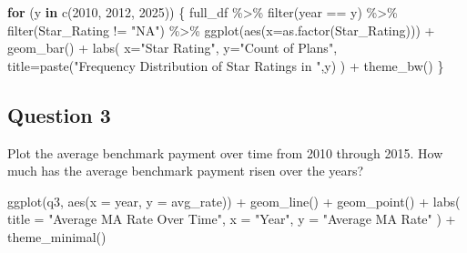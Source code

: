 \documentclass[
]{article}
\newenvironment{Shaded}{\begin{snugshade}}{\end{snugshade}}
\newcommand{\AttributeTok}[1]{\textcolor[rgb]{0.40,0.45,0.13}{#1}}
\newcommand{\ControlFlowTok}[1]{\textcolor[rgb]{0.00,0.23,0.31}{\textbf{#1}}}
\newcommand{\DecValTok}[1]{\textcolor[rgb]{0.68,0.00,0.00}{#1}}
\newcommand{\FunctionTok}[1]{\textcolor[rgb]{0.28,0.35,0.67}{#1}}
\newcommand{\NormalTok}[1]{\textcolor[rgb]{0.00,0.23,0.31}{#1}}
\newcommand{\SpecialCharTok}[1]{\textcolor[rgb]{0.37,0.37,0.37}{#1}}
\newcommand{\StringTok}[1]{\textcolor[rgb]{0.13,0.47,0.30}{#1}}
\begin{document}
\begin{Shaded}
\begin{Highlighting}[]
\ControlFlowTok{for}\NormalTok{ (y }\ControlFlowTok{in} \FunctionTok{c}\NormalTok{(}\DecValTok{2010}\NormalTok{, }\DecValTok{2012}\NormalTok{, }\DecValTok{2025}\NormalTok{)) \{}
\NormalTok{  full\_df }\SpecialCharTok{\%\textgreater{}\%}
    \FunctionTok{filter}\NormalTok{(year }\SpecialCharTok{==}\NormalTok{ y) }\SpecialCharTok{\%\textgreater{}\%}
    \FunctionTok{filter}\NormalTok{(Star\_Rating }\SpecialCharTok{!=} \StringTok{"NA"}\NormalTok{) }\SpecialCharTok{\%\textgreater{}\%}
  \FunctionTok{ggplot}\NormalTok{(}\FunctionTok{aes}\NormalTok{(}\AttributeTok{x=}\FunctionTok{as.factor}\NormalTok{(Star\_Rating))) }\SpecialCharTok{+} 
  \FunctionTok{geom\_bar}\NormalTok{() }\SpecialCharTok{+}
  \FunctionTok{labs}\NormalTok{(}
    \AttributeTok{x=}\StringTok{"Star Rating"}\NormalTok{,}
    \AttributeTok{y=}\StringTok{"Count of Plans"}\NormalTok{,}
    \AttributeTok{title=}\FunctionTok{paste}\NormalTok{(}\StringTok{"Frequency Distribution of Star Ratings in "}\NormalTok{,y)}
\NormalTok{  ) }\SpecialCharTok{+} \FunctionTok{theme\_bw}\NormalTok{()}
\NormalTok{\}}
\end{Highlighting}
\end{Shaded}

\subsection{Question 3}\label{question-3}

Plot the average benchmark payment over time from 2010 through 2015. How
much has the average benchmark payment risen over the years?

\begin{Shaded}
\begin{Highlighting}[]
\FunctionTok{ggplot}\NormalTok{(q3, }\FunctionTok{aes}\NormalTok{(}\AttributeTok{x =}\NormalTok{ year, }\AttributeTok{y =}\NormalTok{ avg\_rate)) }\SpecialCharTok{+}
    \FunctionTok{geom\_line}\NormalTok{() }\SpecialCharTok{+}
    \FunctionTok{geom\_point}\NormalTok{() }\SpecialCharTok{+}
    \FunctionTok{labs}\NormalTok{(}
        \AttributeTok{title =} \StringTok{"Average MA Rate Over Time"}\NormalTok{,}
        \AttributeTok{x =} \StringTok{"Year"}\NormalTok{,}
        \AttributeTok{y =} \StringTok{"Average MA Rate"}
\NormalTok{    ) }\SpecialCharTok{+}
    \FunctionTok{theme\_minimal}\NormalTok{()}
\end{Highlighting}
\end{Shaded}
\end{document}
